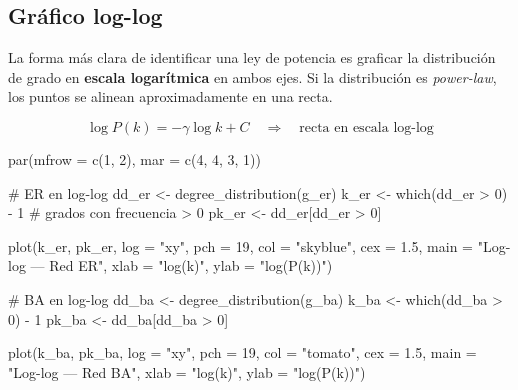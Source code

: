 \documentclass[
  letterpaper,
  DIV=11,
  numbers=noendperiod]{scrreprt}
\newenvironment{Shaded}{\begin{snugshade}}{\end{snugshade}}
\newcommand{\AttributeTok}[1]{\textcolor[rgb]{0.40,0.45,0.13}{#1}}
\newcommand{\CommentTok}[1]{\textcolor[rgb]{0.37,0.37,0.37}{#1}}
\newcommand{\DecValTok}[1]{\textcolor[rgb]{0.68,0.00,0.00}{#1}}
\newcommand{\FloatTok}[1]{\textcolor[rgb]{0.68,0.00,0.00}{#1}}
\newcommand{\FunctionTok}[1]{\textcolor[rgb]{0.28,0.35,0.67}{#1}}
\newcommand{\NormalTok}[1]{\textcolor[rgb]{0.00,0.23,0.31}{#1}}
\newcommand{\OtherTok}[1]{\textcolor[rgb]{0.00,0.23,0.31}{#1}}
\newcommand{\SpecialCharTok}[1]{\textcolor[rgb]{0.37,0.37,0.37}{#1}}
\newcommand{\StringTok}[1]{\textcolor[rgb]{0.13,0.47,0.30}{#1}}
\begin{document}
\subsection{Gráfico log-log}\label{gruxe1fico-log-log}

La forma más clara de identificar una ley de potencia es graficar la
distribución de grado en \textbf{escala logarítmica} en ambos ejes. Si
la distribución es \emph{power-law}, los puntos se alinean
aproximadamente en una recta.

\[
\log P(k) = -\gamma \log k + C \quad \Rightarrow \quad \text{recta en escala log-log}
\]

\begin{Shaded}
\begin{Highlighting}[]
\FunctionTok{par}\NormalTok{(}\AttributeTok{mfrow =} \FunctionTok{c}\NormalTok{(}\DecValTok{1}\NormalTok{, }\DecValTok{2}\NormalTok{), }\AttributeTok{mar =} \FunctionTok{c}\NormalTok{(}\DecValTok{4}\NormalTok{, }\DecValTok{4}\NormalTok{, }\DecValTok{3}\NormalTok{, }\DecValTok{1}\NormalTok{))}

\CommentTok{\# ER en log{-}log}
\NormalTok{dd\_er }\OtherTok{\textless{}{-}} \FunctionTok{degree\_distribution}\NormalTok{(g\_er)}
\NormalTok{k\_er }\OtherTok{\textless{}{-}} \FunctionTok{which}\NormalTok{(dd\_er }\SpecialCharTok{\textgreater{}} \DecValTok{0}\NormalTok{) }\SpecialCharTok{{-}} \DecValTok{1}  \CommentTok{\# grados con frecuencia \textgreater{} 0}
\NormalTok{pk\_er }\OtherTok{\textless{}{-}}\NormalTok{ dd\_er[dd\_er }\SpecialCharTok{\textgreater{}} \DecValTok{0}\NormalTok{]}

\FunctionTok{plot}\NormalTok{(k\_er, pk\_er, }
     \AttributeTok{log =} \StringTok{"xy"}\NormalTok{, }\AttributeTok{pch =} \DecValTok{19}\NormalTok{, }\AttributeTok{col =} \StringTok{"skyblue"}\NormalTok{, }\AttributeTok{cex =} \FloatTok{1.5}\NormalTok{,}
     \AttributeTok{main =} \StringTok{"Log{-}log — Red ER"}\NormalTok{,}
     \AttributeTok{xlab =} \StringTok{"log(k)"}\NormalTok{, }\AttributeTok{ylab =} \StringTok{"log(P(k))"}\NormalTok{)}

\CommentTok{\# BA en log{-}log}
\NormalTok{dd\_ba }\OtherTok{\textless{}{-}} \FunctionTok{degree\_distribution}\NormalTok{(g\_ba)}
\NormalTok{k\_ba }\OtherTok{\textless{}{-}} \FunctionTok{which}\NormalTok{(dd\_ba }\SpecialCharTok{\textgreater{}} \DecValTok{0}\NormalTok{) }\SpecialCharTok{{-}} \DecValTok{1}
\NormalTok{pk\_ba }\OtherTok{\textless{}{-}}\NormalTok{ dd\_ba[dd\_ba }\SpecialCharTok{\textgreater{}} \DecValTok{0}\NormalTok{]}

\FunctionTok{plot}\NormalTok{(k\_ba, pk\_ba, }
     \AttributeTok{log =} \StringTok{"xy"}\NormalTok{, }\AttributeTok{pch =} \DecValTok{19}\NormalTok{, }\AttributeTok{col =} \StringTok{"tomato"}\NormalTok{, }\AttributeTok{cex =} \FloatTok{1.5}\NormalTok{,}
     \AttributeTok{main =} \StringTok{"Log{-}log — Red BA"}\NormalTok{,}
     \AttributeTok{xlab =} \StringTok{"log(k)"}\NormalTok{, }\AttributeTok{ylab =} \StringTok{"log(P(k))"}\NormalTok{)}
\end{Highlighting}
\end{Shaded}
\end{document}
